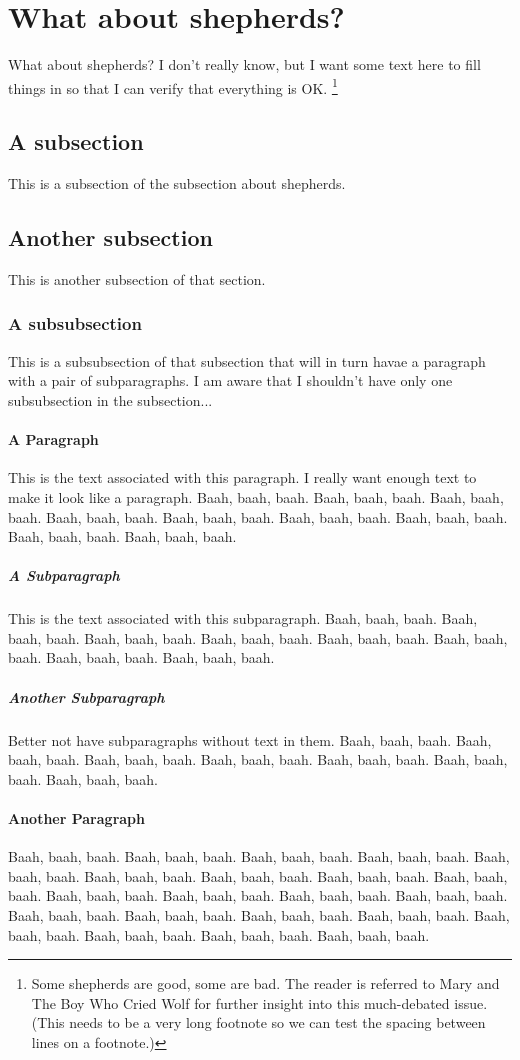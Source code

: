 \documentclass[12pt,honorthesis]{thesis}          %
\begin{document}
\section{What about shepherds?}
What about shepherds?  I don't really know, but I want some text here
to fill things in so that I can verify that everything is OK.%
\footnote{Some shepherds are good, some are bad. The reader is referred
  to Mary and The Boy Who Cried Wolf for further insight into this
  much-debated issue. (This needs to be a very long footnote so we can
  test the spacing between lines on a footnote.)}
\subsection{A subsection}
This is a subsection of the subsection about shepherds.
\subsection{Another subsection}
This is another subsection of that section.
\subsubsection{A subsubsection}
This is a subsubsection of that subsection that will in turn havae a
paragraph with a pair of subparagraphs.  I am aware that I shouldn't
have only one subsubsection in the subsection...
\paragraph{A Paragraph} 
This is the text associated with this paragraph.  I really want enough
text to make it look like a paragraph.  Baah, baah, baah.  Baah, baah,
baah.  Baah, baah, baah.  Baah, baah, baah.  Baah, baah, baah.  Baah,
baah, baah.  Baah, baah, baah.  Baah, baah, baah.  Baah, baah, baah. 
\subparagraph{A Subparagraph} 
This is the text associated with this subparagraph.  Baah, baah, baah.
Baah, baah, baah.  Baah, baah, baah.  Baah, baah, baah.  Baah, baah,
baah.  Baah, baah, baah.  Baah, baah, baah.  Baah, baah, baah. 
\subparagraph{Another Subparagraph}
Better not have subparagraphs without text in them.  Baah, baah, baah.
Baah, baah, baah.  Baah, baah, baah.  Baah, baah, baah.  Baah, baah,
baah.  Baah, baah, baah.  Baah, baah, baah. 
\paragraph{Another Paragraph}
Baah, baah, baah.  Baah, baah, baah.  Baah, baah, baah.  Baah, baah,
baah.  Baah, baah, baah.  Baah, baah, baah.  Baah, baah, baah.  Baah,
baah, baah.  Baah, baah, baah.  Baah, baah, baah.  Baah, baah, baah.
Baah, baah, baah.  Baah, baah, baah.  Baah, baah, baah.  Baah, baah,
baah.  Baah, baah, baah.  Baah, baah, baah.  Baah, baah, baah.  Baah,
baah, baah.  Baah, baah, baah.  Baah, baah, baah.
\end{document}
